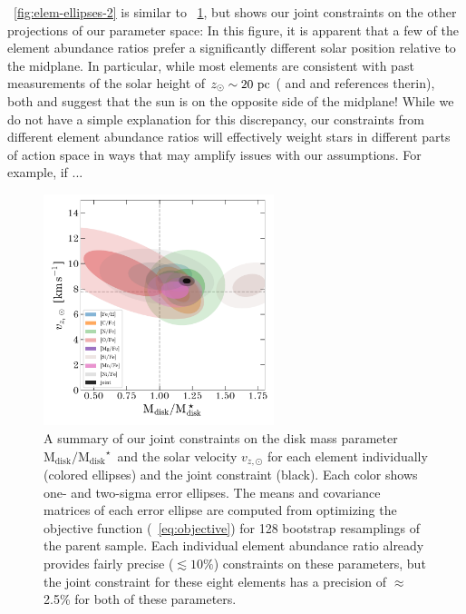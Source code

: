 \documentclass[modern]{aastex63}
\newcommand{\mdisk}{\ensuremath{\mathrm{M}_\mathrm{disk}}}
\newcommand{\mratio}{\ensuremath{\mdisk / \mdisk^\star}}
\begin{document}
\figurename~\ref{fig:elem-ellipses-2} is similar to
\figurename~\ref{fig:elem-ellipses-1}, but shows our joint constraints on the
other projections of our parameter space:
In this figure, it is apparent that a few of the element abundance ratios prefer
a significantly different solar position relative to the midplane.
In particular, while most elements are consistent with past measurements of the
solar height of $z_\odot \sim 20~\mathrm{pc}$ (\citealt{Bennett:2019} and
\citealt{Bland-Hawthorn:2016} and references therin), both 
and  suggest that the sun is on the opposite side of the
midplane!
While we do not have a simple explanation for this discrepancy, our constraints
from different element abundance ratios will effectively weight stars in
different parts of action space in ways that may amplify issues with our
assumptions.
For example, if ...


\begin{figure}[!tp]
  \begin{mdframed}
  \begin{center}
  \includegraphics[width=0.6\textwidth]{M-vz-error-ellipses.pdf}
  \end{center}
  \caption{%
    A summary of our joint constraints on the disk mass parameter \mratio\ and
    the solar velocity $v_{z, \odot}$ for each element individually (colored
    ellipses) and the joint constraint (black).
    Each color shows one- and two-sigma error ellipses.
    The means and covariance matrices of each error ellipse are computed from
    optimizing the objective function (\equationname~\ref{eq:objective}) for 128
    bootstrap resamplings of the parent sample.
    Each individual element abundance ratio already provides fairly precise
    ($\lesssim10\%$) constraints on these parameters, but the joint constraint
    for these eight elements has a precision of $\approx$2.5\% for both of these
    parameters.
  \label{fig:elem-ellipses-1}
  }
  \end{mdframed}
\end{figure}
\end{document}
